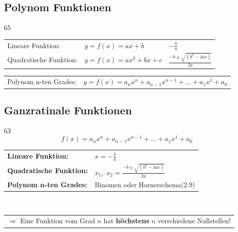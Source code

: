 \subsection{Polynom Funktionen}{65}

\renewcommand{\arraystretch}{1.6}
\begin{tabular}{lll}
    Lineare Funktion:       & $ y = f(x) = ax+b$            & $ -\frac{b}{a}$\\
    Quadratische Funktion:  & $ y = f(x) = ax^2+bx+c$       & $\frac{-b \pm \sqrt{(b^2-4ac)}}{2a}$ 
\end{tabular}
\begin{tabular}{ll}
    Polynom n-ten Grades:   & $ y = f(x) = a_nx^n + a_{n-1}x^{n-1} + \ldots + a_1x^1 + a_0$
\end{tabular}

\subsection{Ganzratinale Funktionen}{63}
\[
f(x) = a_nx^n + a_{n-1}x^{n-1} + \ldots + a_1x^1 + a_0
\]

\renewcommand{\arraystretch}{1.4}
\begin{tabular}{ll}
    \textbf{Lineare Funktion:}          &     $ x = -\frac{b}{a}$\\
    \textbf{Quadratische Funktion:}     &     $ x_1,\; x_2 = \frac{-b \pm \sqrt{(b^2-4ac)}}{2a}$\\
    \textbf{Polynom n-ten Grades:}      &     Binomen oder Hornerschema\;(2.9)
\end{tabular}\\
\begin{tabular}{l}
    $\Rightarrow$ Eine Funktion vom Grad $n$ hat \textbf{höchstens} $n$ verschiedene Nullstellen!
\end{tabular}

